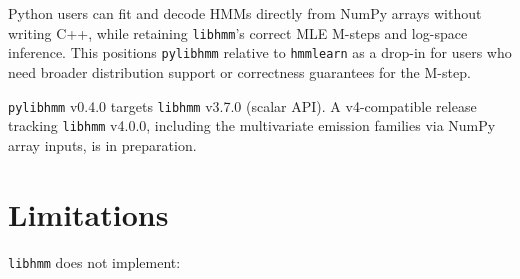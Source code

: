 \documentclass[11pt]{article}
\begin{document}
Python users can fit and decode HMMs directly from NumPy arrays without
writing C++, while retaining \texttt{libhmm}'s correct MLE M-steps and
log-space inference.
This positions \texttt{pylibhmm} relative to \texttt{hmmlearn} as a
drop-in for users who need broader distribution support or correctness
guarantees for the M-step.

\texttt{pylibhmm} v0.4.0 targets \texttt{libhmm} v3.7.0 (scalar API).
A v4-compatible release tracking \texttt{libhmm} v4.0.0, including the
multivariate emission families via NumPy array inputs, is in preparation.

\section{Limitations}
\label{sec:limitations}

\texttt{libhmm} does not implement:
\end{document}
